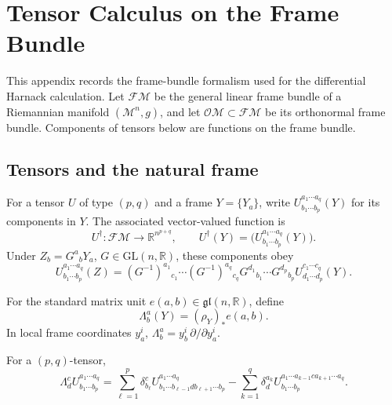 \chapter{Tensor Calculus on the Frame Bundle}
\label{app:chow-ii-frame-bundle-tensor-calculus}

This appendix records the frame-bundle formalism used for the differential
Harnack calculation.  Let $\mathcal F\mathcal M$ be the general linear frame
bundle of a Riemannian manifold $(\mathcal M^n,g)$, and let
$\mathcal O\mathcal M\subset\mathcal F\mathcal M$ be its orthonormal frame
bundle.  Components of tensors below are functions on the frame bundle.

\section{Tensors and the natural frame}

\begin{definition}
\label{def:chow-ii-frame-tensor-components}
For a tensor $U$ of type $(p,q)$ and a frame $Y=\{Y_a\}$, write
$U^{a_1\cdots a_q}_{b_1\cdots b_p}(Y)$ for its components in $Y$.  The
associated vector-valued function is
\[
 U^\dagger:\mathcal F\mathcal M\longrightarrow
 \mathbb R^{n^{p+q}},\qquad
 U^\dagger(Y)=\bigl(U^{a_1\cdots a_q}_{b_1\cdots b_p}(Y)\bigr).
\]
Under $Z_b=G^a{}_bY_a$, $G\in\mathrm{GL}(n,\mathbb R)$, these components obey
\[
 U^{a_1\cdots a_q}_{b_1\cdots b_p}(Z)=
 (G^{-1})^{a_1}{}_{c_1}\cdots(G^{-1})^{a_q}{}_{c_q}
 G^{d_1}{}_{b_1}\cdots G^{d_p}{}_{b_p}
 U^{c_1\cdots c_q}_{d_1\cdots d_p}(Y).
\]
\end{definition}

\begin{definition}
\label{def:chow-ii-vertical-frame-fields}
For the standard matrix unit $e(a,b)\in\mathfrak{gl}(n,\mathbb R)$, define
\[
 \Lambda^a_b(Y)=(\rho_Y)_*e(a,b).
\]
In local frame coordinates $y_a^i$,
$\Lambda^a_b=y_b^i\,\partial/\partial y_a^i$.
\end{definition}

\begin{lemma}
\label{lem:chow-ii-vertical-tensor-action}
For a $(p,q)$-tensor,
\[
 \Lambda^c_d U^{a_1\cdots a_q}_{b_1\cdots b_p}
 =\sum_{\ell=1}^p\delta^c_{b_\ell}
 U^{a_1\cdots a_q}_{b_1\cdots b_{\ell-1}d b_{\ell+1}\cdots b_p}
 -\sum_{k=1}^q\delta^{a_k}_d
 U^{a_1\cdots a_{k-1}c a_{k+1}\cdots a_q}_{b_1\cdots b_p}.
\]
\end{lemma}

